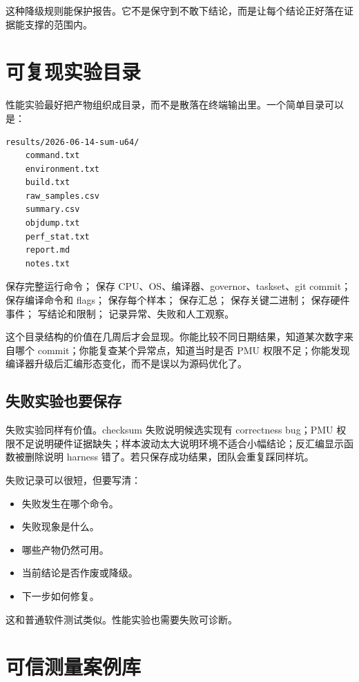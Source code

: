 这种降级规则能保护报告。它不是保守到不敢下结论，而是让每个结论正好落在证据能支撑的范围内。

\section{可复现实验目录}

性能实验最好把产物组织成目录，而不是散落在终端输出里。一个简单目录可以是：

\begin{lstlisting}
results/2026-06-14-sum-u64/
    command.txt
    environment.txt
    build.txt
    raw_samples.csv
    summary.csv
    objdump.txt
    perf_stat.txt
    report.md
    notes.txt
\end{lstlisting}

 保存完整运行命令； 保存 CPU、OS、编译器、governor、taskset、git commit； 保存编译命令和 flags； 保存每个样本； 保存汇总； 保存关键二进制； 保存硬件事件； 写结论和限制； 记录异常、失败和人工观察。

这个目录结构的价值在几周后才会显现。你能比较不同日期结果，知道某次数字来自哪个 commit；你能复查某个异常点，知道当时是否 PMU 权限不足；你能发现编译器升级后汇编形态变化，而不是误以为源码优化了。

\subsection{失败实验也要保存}

失败实验同样有价值。checksum 失败说明候选实现有 correctness bug；PMU 权限不足说明硬件证据缺失；样本波动太大说明环境不适合小幅结论；反汇编显示函数被删除说明 harness 错了。若只保存成功结果，团队会重复踩同样坑。

失败记录可以很短，但要写清：

\begin{itemize}
  \item 失败发生在哪个命令。
  \item 失败现象是什么。
  \item 哪些产物仍然可用。
  \item 当前结论是否作废或降级。
  \item 下一步如何修复。
\end{itemize}

这和普通软件测试类似。性能实验也需要失败可诊断。

\section{可信测量案例库}

